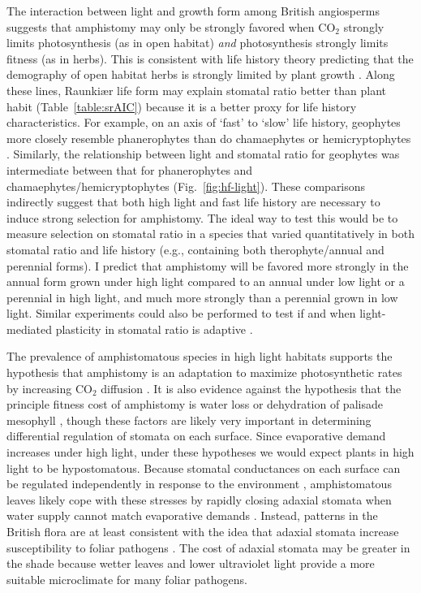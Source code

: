 \documentclass[12pt, oneside]{article}
\begin{document}
The interaction between light and growth form among British angiosperms suggests that amphistomy may only be strongly favored when CO$_2$ strongly limits photosynthesis (as in open habitat) \textit{and} photosynthesis strongly limits fitness (as in herbs). This is consistent with life history theory predicting that the demography of open habitat herbs is strongly limited by plant growth \citep{Franco_Silvertown_1996}. Along these lines, Raunki\ae r life form may explain stomatal ratio better than plant habit (Table~\ref{table:srAIC}) because it is a better proxy for life history characteristics. For example, on an axis of `fast' to `slow' life history, geophytes more closely resemble phanerophytes than do chamaephytes or hemicryptophytes \citep{Salguero-Gomez_etal_2016}. Similarly, the relationship between light and stomatal ratio for geophytes was intermediate between that for phanerophytes and chamaephytes/hemicryptophytes (Fig.~\ref{fig:hf-light}). These comparisons indirectly suggest that both high light and fast life history are necessary to induce strong selection for amphistomy. The ideal way to test this would be to measure selection on stomatal ratio in a species that varied quantitatively in both stomatal ratio and life history (e.g., containing both therophyte/annual and perennial forms). I predict that amphistomy will be favored more strongly in the annual form grown under high light compared to an annual under low light or a perennial in high light, and much more strongly than a perennial grown in low light. Similar experiments could also be performed to test if and when light-mediated plasticity in stomatal ratio is adaptive \citep{Gay_Hurd_1975, Mott_Michaelson_1991, Fontana_etal_2017}.

The prevalence of amphistomatous species in high light habitats supports the hypothesis that amphistomy is an adaptation to maximize photosynthetic rates by increasing CO$_2$ diffusion \citep{Jones_1985}. It is also evidence against the hypothesis that the principle fitness cost of amphistomy is water loss \citep{Darwin_1886, Foster_Smith_1986} or dehydration of palisade mesophyll \citep{Buckley_etal_2015}, though these factors are likely very important in determining differential regulation of stomata on each surface. Since evaporative demand increases under high light, under these hypotheses we would expect plants in high light to be hypostomatous. Because stomatal conductances on each surface can be regulated independently in response to the environment \citep{Darwin_1898, Pospisilova_Solarova_1980, Smith_1981, Reich_1984, Mott_Oleary_1984}, amphistomatous leaves likely cope with these stresses by rapidly closing adaxial stomata when water supply cannot match evaporative demands \citep{Richardson_etal_2017}. Instead, patterns in the British flora are at least consistent with the idea that adaxial stomata increase susceptibility to foliar pathogens \citep{Gutschick_1984b, Mckown_etal_2014}. The cost of adaxial stomata may be greater in the shade because wetter leaves and lower ultraviolet light provide a more suitable microclimate for many foliar pathogens.
\end{document}
